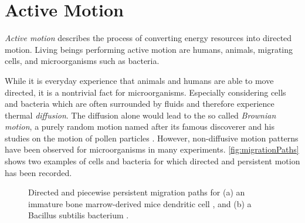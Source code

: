 \chapter{Active Motion}\label{ch:activeMotion}
\textit{Active motion} describes the process of converting energy resources into directed motion. Living beings performing active motion are \eg humans, animals, migrating cells, and microorganisms such as bacteria.

While it is everyday experience that animals and humans are able to move directed, it is a nontrivial fact for microorganisms. Especially considering cells and bacteria which are often surrounded by fluids and therefore experience thermal \textit{diffusion}. The diffusion alone would lead to the so called \textit{Brownian motion}, a purely random motion named after its famous discoverer \citeauthor{brown:1828} and his studies on the motion of pollen particles \cite{brown:1828}. However, non-diffusive motion patterns have been observed for microorganisms in many experiments. \autoref{fig:migrationPaths} shows two examples of cells and bacteria for which directed and persistent motion has been recorded.

\begin{figure}[bth]
    \myfloatalign
     \quad
    \caption[Directed, persistent migration paths]{Directed and piecewise persistent migration paths for (a) an immature bone marrow-derived mice dendritic cell \cite{maiuri:2015}, and (b) a Bacillus subtilis bacterium \cite{najafi:2018}.}\label{fig:migrationPaths}
\end{figure}

